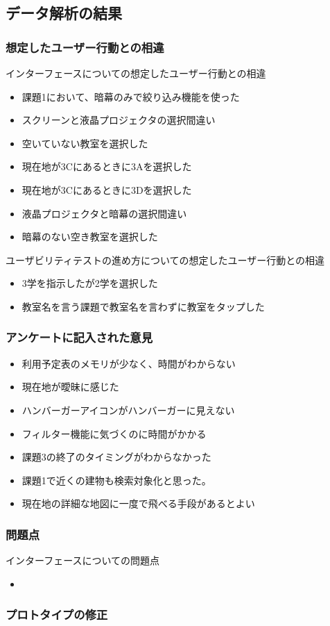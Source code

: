 \documentclass[12pt,a4paper,dvipdf]{jsarticle}
\begin{document}
\subsection{データ解析の結果}
\subsubsection{想定したユーザー行動との相違}
インターフェースについての想定したユーザー行動との相違
\begin{itemize}
    \item 課題1において、暗幕のみで絞り込み機能を使った
    \item スクリーンと液晶プロジェクタの選択間違い
    \item 空いていない教室を選択した
    \item 現在地が3Cにあるときに3Aを選択した
    \item 現在地が3Cにあるときに3Dを選択した
    \item 液晶プロジェクタと暗幕の選択間違い
    \item 暗幕のない空き教室を選択した
\end{itemize}
ユーザビリティテストの進め方についての想定したユーザー行動との相違
\begin{itemize}
    \item 3学を指示したが2学を選択した
    \item 教室名を言う課題で教室名を言わずに教室をタップした
\end{itemize}

\subsubsection{アンケートに記入された意見}
\begin{itemize}
    \item 利用予定表のメモリが少なく、時間がわからない
    \item 現在地が曖昧に感じた
    \item ハンバーガーアイコンがハンバーガーに見えない
    \item フィルター機能に気づくのに時間がかかる
    \item 課題3の終了のタイミングがわからなかった
    \item 課題1で近くの建物も検索対象化と思った。
    \item 現在地の詳細な地図に一度で飛べる手段があるとよい
\end{itemize}
\subsubsection{問題点}
インターフェースについての問題点
\begin{itemize}
    \item
\end{itemize}
\subsubsection{プロトタイプの修正}
\end{document}
